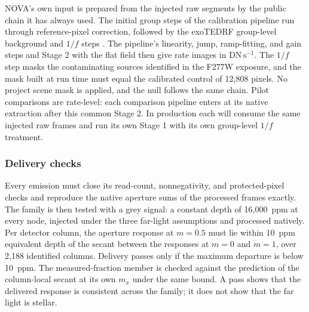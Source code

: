 NOVA's own input is prepared from the injected raw segments by the public
chain it has always used. The initial group steps of the calibration
pipeline \citep{JWSTPipeline2025} run through reference-pixel
correction, followed by the exoTEDRF group-level background and $1/f$
steps \citep{Radica2024}. The pipeline's linearity, jump, ramp-fitting,
and gain steps and Stage 2 with the flat field then give rate images in
$\mathrm{DN\,s^{-1}}$. The $1/f$ step masks the contaminating sources
identified in the F277W exposure, and the mask built at run time must
equal the calibrated control of 12{,}808 pixels. No project scene mask
is applied, and the null follows the same chain. Pilot comparisons are
rate-level: each comparison pipeline enters at its native extraction
after this common Stage 2. In production each will consume the same
injected raw frames and run its own Stage 1 with its own group-level
$1/f$ treatment.

\subsubsection{Delivery checks}


Every emission must close its read-count, nonnegativity, and
protected-pixel checks and reproduce the native aperture sums of the
processed frames exactly. The family is then tested with a grey signal:
a constant depth of 16{,}000~ppm at every node, injected under the three
far-light assumptions and processed natively. Per detector column, the
aperture response at $m=0.5$ must lie within 10~ppm equivalent depth of
the secant between the responses at $m=0$ and $m=1$, over 2{,}188
identified columns. Delivery passes only if the maximum departure is
below 10~ppm. The measured-fraction member is checked against the
prediction of the column-local secant at its own $m_x$ under the same
bound. A pass shows that the delivered response is consistent across the
family; it does not show that the far light is stellar.

